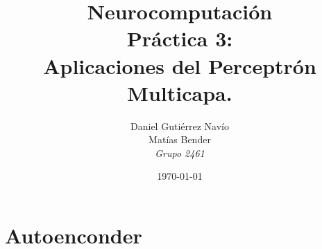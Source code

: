 \documentclass[12pt]{article}
\begin{document}
\title{
     {\bf Neurocomputación} \\
     Práctica 3:\\ {\bf Aplicaciones del Perceptrón Multicapa}.\\
}
\author{
     Daniel Gutiérrez Navío \\
     Matías Bender \\
     \textit{Grupo 2461}
}
\date{\today}

\maketitle

\thispagestyle{empty}
\newpage


\tableofcontents
\newpage


%

\setcounter{page}{1}

\setlength{\parindent}{0pt}

\setlength{\parskip}{8pt}


\newpage

\section{Autoenconder}
\end{document}

